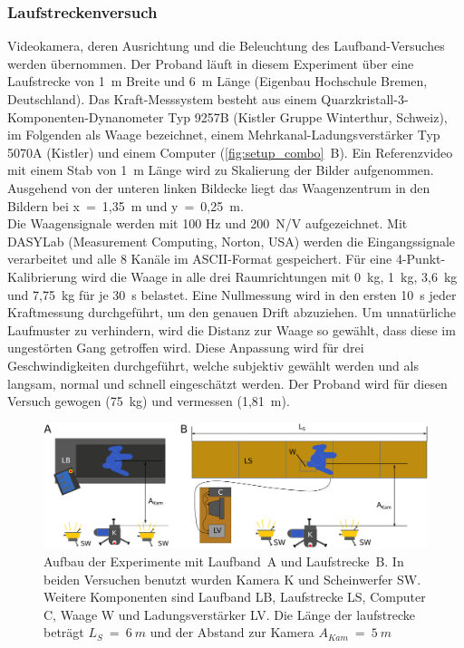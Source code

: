 \subsubsection{Laufstreckenversuch}
Videokamera, deren Ausrichtung und die Beleuchtung des Laufband-Versuches werden übernommen. Der Proband läuft in diesem Experiment über eine Laufstrecke von 1~m Breite und 6~m Länge (Eigenbau Hochschule Bremen, Deutschland). Das Kraft-Messsystem besteht aus einem Quarzkristall-3-Komponenten-Dynanometer Typ 9257B (Kistler Gruppe Winterthur, Schweiz), im Folgenden als Waage bezeichnet, einem Mehrkanal-Ladungsverstärker Typ 5070A (Kistler) und einem Computer (\autoref{fig:setup_combo}~B). Ein Referenzvideo mit einem Stab von 1~m Länge wird zu Skalierung der Bilder aufgenommen. Ausgehend von der unteren linken Bildecke liegt das Waagenzentrum in den Bildern bei x~=~1,35~m und y~=~0,25~m.\\
Die Waagensignale werden mit 100 Hz und 200~N/V aufgezeichnet. Mit DASYLab (Measurement Computing, Norton, USA) werden die Eingangssignale verarbeitet und alle 8 Kanäle im ASCII-Format gespeichert. Für eine 4-Punkt-Kalibrierung wird die Waage in alle drei Raumrichtungen mit 0~kg, 1~kg, 3,6~kg und 7,75~kg für je 30~s belastet. Eine Nullmessung wird in den ersten 10~s jeder Kraftmessung durchgeführt, um den genauen Drift abzuziehen. Um unnatürliche Laufmuster zu verhindern, wird die Distanz zur Waage so gewählt, dass diese im ungestörten Gang getroffen wird. Diese Anpassung wird für drei Geschwindigkeiten durchgeführt, welche subjektiv gewählt werden und als langsam, normal und schnell eingeschätzt werden. Der Proband wird für diesen Versuch gewogen (75~kg) und vermessen (1,81~m).
\begin{figure}[h!]
	\centering
	\includegraphics[width=\linewidth]{bilder/mat_met/Setup_combo}
	\caption[Aufbau Laufband- und Laufstreckenversuch]{Aufbau der Experimente mit Laufband~A und Laufstrecke~B. In beiden Versuchen benutzt wurden Kamera K und Scheinwerfer SW. Weitere Komponenten sind Laufband LB, Laufstrecke LS, Computer C, Waage W und Ladungsverstärker LV. Die Länge der laufstrecke beträgt $L_S~=~6~m$ und der Abstand zur Kamera $A_{Kam}~=~5~m$}
	\label{fig:setup_combo}
\end{figure}


